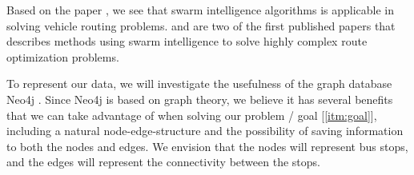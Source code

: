 Based on the paper \citet{dorigo97}, we see that swarm intelligence algorithms is applicable in solving vehicle routing problems. \citet{dorigo97} and \citet{lucic03} are two of the first published papers that describes methods using swarm intelligence to solve highly complex route optimization problems. 

To represent our data, we will investigate the usefulness of the graph database Neo4j \citep{website:neo4j}. Since Neo4j is based on graph theory, we believe it has several benefits that we can take advantage of when solving our problem / goal [\ref{itm:goal}], including a natural node-edge-structure and the possibility of saving information to both the nodes and edges. We envision that the nodes will represent bus stops, and the edges will represent the connectivity between the stops.





  

